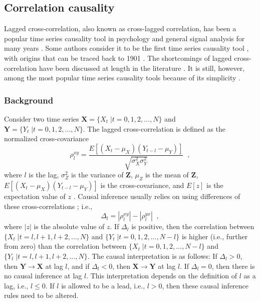 \documentclass{article}[10pt]
\begin{document}
\subsection{Correlation causality}
Lagged cross-correlation, also known as cross-lagged correlation, has been a popular time series causality tool in psychology \cite{Kenny1975,Rogosa1980} and general signal analysis for many years \cite{Mcnames2007}.  Some authors consider it to be the first time series causality tool \cite{Kenny1975}, with origins that can be traced back to 1901 \cite{Bartlett1935}.  The shortcomings of lagged cross-correlation have been discussed at length in the literature \cite{Rogosa1980,Runge2014,Mcnames2007}.  It is still, however, among the most popular time series causality tools because of its simplicity \cite{Mcnames2007,Rogosa1980}.  

\subsubsection{Background}
Consider two time series $\mathbf{X} = \{X_t\;|t=0,1,2,\ldots,N\}$ and $\mathbf{Y} = \{Y_t\;|t=0,1,2,\ldots,N\}$.  The lagged cross-correlation is defined as the normalized cross-covariance \cite{Box2013}
\begin{equation}
\rho^{xy}_l = \frac{E\left[\left(X_t-\mu_X\right)\left(Y_{t-l}-\mu_Y\right)\right]}{\sqrt{\sigma^2_X\sigma^2_Y}}\;\;,
\end{equation}
where $l$ is the lag, $\sigma^2_Z$ is the variance of $\mathbf{Z}$, $\mu_Z$ is the mean of $\mathbf{Z}$, $E\left[\left(X_t-\mu_X\right)\left(Y_{t-l}-\mu_Y\right)\right]$ is the cross-covariance, and $E[z]$ is the expectation value of $z$ \cite{Carter1987,Mcnames2007,Box2013}.  Causal inference usually relies on using differences of these cross-correlations \cite{Rogosa1980,Rozelle1969,Yee1968}; i.e.,
\begin{equation}
\Delta_l = |\rho^{xy}_l| - |\rho^{yx}_l|\;\;,
\end{equation}
where $|z|$ is the absolute value of $z$.  If $\Delta_l$ is positive, then the correlation between $\{X_t\;|t=l,l+1,l+2,\ldots,N\}$ and $\{Y_t\;|t=0,1,2,\ldots,N-l\}$ is higher (i.e., further from zero) than the correlation between $\{X_t\;|t=0,1,2,\ldots,N-l\}$ and $\{Y_t\;|t=l,l+1,l+2,\ldots,N\}$.  The causal interpretation is as follows: If $\Delta_l > 0$, then $\mathbf{Y}\rightarrow\mathbf{X}$ at lag $l$, and if $\Delta_l < 0$, then $\mathbf{X}\rightarrow\mathbf{Y}$ at lag $l$.  If $\Delta_l = 0$, then there is no causal inference at lag $l$.  This interpretation depends on the definition of $l$ as a lag, i.e., $l\le 0$.  If $l$ is allowed to be a lead, i.e., $l>0$, then these causal inference rules need to be altered.
\end{document}
